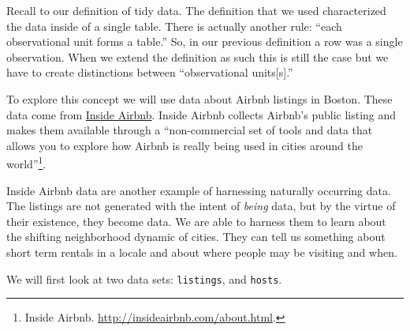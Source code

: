 \documentclass[
]{book}
\newenvironment{Shaded}{\begin{snugshade}}{\end{snugshade}}
\newcommand{\CommentTok}[1]{\textcolor[rgb]{0.56,0.35,0.01}{\textit{#1}}}
\newcommand{\KeywordTok}[1]{\textcolor[rgb]{0.13,0.29,0.53}{\textbf{#1}}}
\newcommand{\NormalTok}[1]{#1}
\newcommand{\StringTok}[1]{\textcolor[rgb]{0.31,0.60,0.02}{#1}}
\begin{document}
Recall to our definition of tidy data. The definition that we used characterized the data inside of a single table. There is actually another rule: ``each observational unit forms a table.'' So, in our previous definition a row was a single observation. When we extend the definition as such this is still the case but we have to create distinctions between ``observational units{[}s{]}.''

To explore this concept we will use data about Airbnb listings in Boston. These data come from \href{http://insideairbnb.com}{Inside Airbnb}. Inside Airbnb collects Airbnb's public listing and makes them available through a ``non-commercial set of tools and data that allows you to explore how Airbnb is really being used in cities around the world''\footnote{Inside Airbnb. \url{http://insideairbnb.com/about.html}.}.

Inside Airbnb data are another example of harnessing naturally occurring data. The listings are not generated with the intent of \emph{being} data, but by the virtue of their existence, they become data. We are able to harness them to learn about the shifting neighborhood dynamic of cities. They can tell us something about short term rentals in a locale and about where people may be visiting and when.

We will first look at two data sets: \texttt{listings}, and \texttt{hosts}.

\begin{Shaded}
\end{Shaded}
\end{document}
